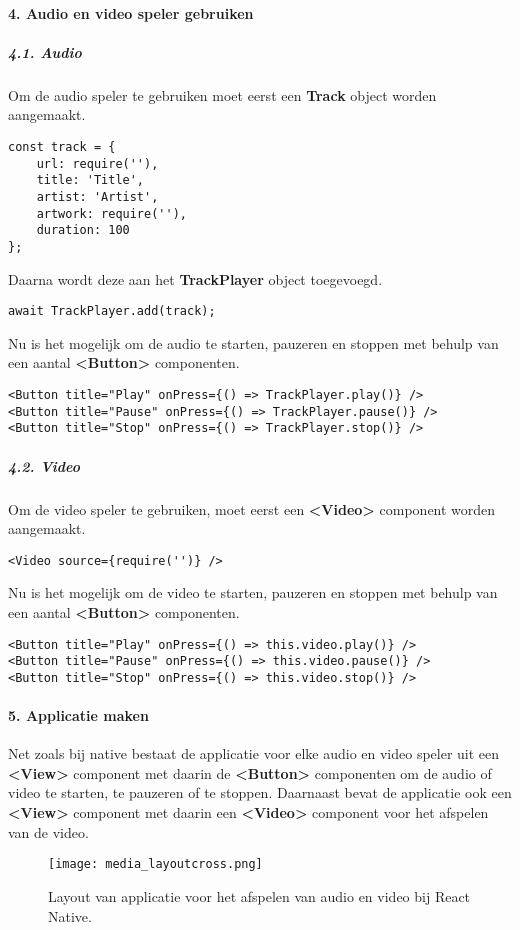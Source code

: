 \paragraph{4. Audio en video speler gebruiken}
\subparagraph{4.1. Audio}
Om de audio speler te gebruiken moet eerst een \textbf{Track} object worden aangemaakt.
\begin{verbatim}
const track = {
    url: require(''),
    title: 'Title',
    artist: 'Artist',
    artwork: require(''),
    duration: 100
};
\end{verbatim}
Daarna wordt deze aan het \textbf{TrackPlayer} object toegevoegd.
\begin{verbatim}
await TrackPlayer.add(track);
\end{verbatim}
Nu is het mogelijk om de audio te starten, pauzeren en stoppen met behulp 
van een aantal \textbf{<Button>} componenten.
\begin{verbatim}
<Button title="Play" onPress={() => TrackPlayer.play()} />
<Button title="Pause" onPress={() => TrackPlayer.pause()} />
<Button title="Stop" onPress={() => TrackPlayer.stop()} />
\end{verbatim}

\subparagraph{4.2. Video}
Om de video speler te gebruiken, moet eerst een \textbf{<Video>} component worden aangemaakt.
\begin{verbatim}
<Video source={require('')} />
\end{verbatim}
Nu is het mogelijk om de video te starten, pauzeren en stoppen met behulp
van een aantal \textbf{<Button>} componenten.
\begin{verbatim}
<Button title="Play" onPress={() => this.video.play()} />
<Button title="Pause" onPress={() => this.video.pause()} />
<Button title="Stop" onPress={() => this.video.stop()} />
\end{verbatim}

\paragraph{5. Applicatie maken}
Net zoals bij native bestaat de applicatie voor elke audio en video speler uit een \textbf{<View>}
component met daarin de \textbf{<Button>} componenten om de audio of video te starten, te pauzeren
of te stoppen. Daarnaast bevat de applicatie ook een \textbf{<View>} component met daarin een
\textbf{<Video>} component voor het afspelen van de video.
\begin{figure}[H]
    \centering
    \texttt{[image: media\_layoutcross.png]}
    \caption{Layout van applicatie voor het afspelen van audio en video bij React Native.}
\end{figure}


